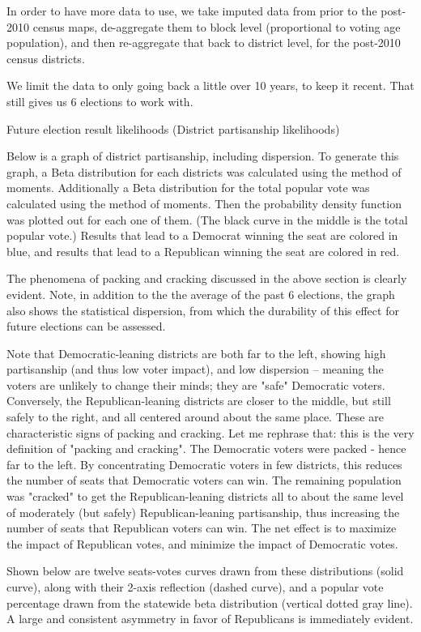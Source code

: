 \documentclass[preprint,12pt]{article}
\begin{document}
In order to have more data to use, we take imputed data from prior to the post-2010 census maps, de-aggregate them to block level (proportional to voting age population), and then re-aggregate that back to district level, for the post-2010 census districts.
 
We limit the data to only going back a little over 10 years, to keep it recent.  That still gives us 6 elections to work with.
 
Future election result likelihoods (District partisanship likelihoods)
 
Below is a graph of district partisanship, including dispersion.  To generate this graph, a Beta distribution for each districts was calculated using the method of moments.  Additionally a Beta distribution for the total popular vote was calculated using the method of moments.  Then the probability density function was plotted out for each one of them.  (The black curve in the middle is the total popular vote.) Results that lead to a Democrat winning the seat are colored in blue, and results that lead to a Republican winning the seat are colored in red.
 
The phenomena of packing and cracking discussed in the above section is clearly evident.  Note, in addition to the the average of the past 6 elections, the graph also shows the statistical dispersion, from which the durability of this effect for future elections can be assessed.

 
Note that Democratic-leaning districts are both far to the left, showing high partisanship (and thus low voter impact), and low dispersion -- meaning the voters are unlikely to change their minds; they are "safe" Democratic voters.  Conversely, the Republican-leaning districts are closer to the middle, but still safely to the right, and all centered around about the same place.   These are characteristic signs of packing and cracking.  Let me rephrase that: this is the very definition of "packing and cracking".  The Democratic voters were packed - hence far to the left.  By concentrating Democratic voters in few districts, this reduces the number of seats that Democratic voters can win.  The remaining population was "cracked" to get the Republican-leaning districts all to about the same level of moderately (but safely) Republican-leaning partisanship, thus increasing the number of seats that Republican voters can win.  The net effect is to maximize the impact of Republican votes, and minimize the impact of Democratic votes.
 
Shown below are twelve seats-votes curves drawn from these distributions (solid curve), along with their 2-axis reflection (dashed curve), and a popular vote percentage drawn from the statewide beta distribution (vertical dotted gray line).  A large and consistent asymmetry in favor of Republicans is immediately evident.
 
\end{document}
